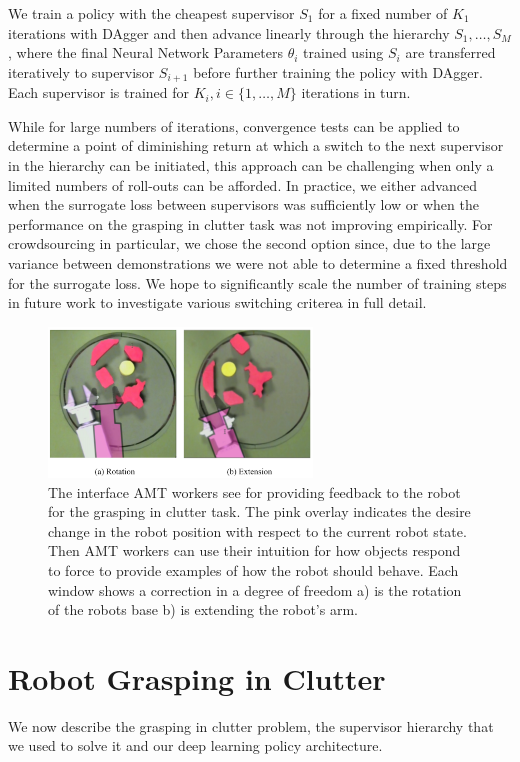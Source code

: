 \documentclass[10pt, conference]{ieeeconf}      %
\begin{document}
We train a policy with the cheapest supervisor $S_1$ for a fixed number of $K_1$ iterations with DAgger and then advance
linearly through the hierarchy $S_1, \ldots, S_M$, where the final Neural Network Parameters $\theta_i$ trained using
$S_i$ are transferred iteratively to supervisor $S_{i+1}$ before further training the policy with DAgger.
Each supervisor is trained for $K_i, i\in \{1, \ldots, M\}$ iterations in turn. 

While for large numbers of iterations, convergence tests can be applied to determine a point of diminishing return at
which a switch to the next supervisor in the hierarchy can be initiated, this approach can be challenging when only a
limited numbers of roll-outs can be afforded. In practice, we either advanced when the surrogate loss between
supervisors was sufficiently low or when the performance on the grasping in clutter task was not improving empirically. 
For crowdsourcing in particular, we chose the second option since, due to the large variance between demonstrations
we were not able to determine a fixed threshold for the surrogate loss. We hope to significantly scale the number of
training steps in future work to investigate various switching criterea in full detail.

\begin{figure}[t]
\centering

\includegraphics[width=\columnwidth, height=4cm]{f_figs/labeling.pdf}

\caption{\footnotesize  The interface AMT workers see for providing feedback to the robot for the grasping in clutter task. The pink overlay indicates the desire change in the robot position with respect to the current robot state. Then AMT workers can use their intuition for how objects respond to force to provide examples of how the robot should behave. Each window shows a correction in a degree of freedom a) is the rotation of the robots base b) is extending the robot's arm.}
\vspace*{-10pt}
\label{fig:overlays}
\end{figure}


\section{Robot Grasping in Clutter}
We now describe the grasping in clutter problem, the supervisor hierarchy that we used to solve it and our deep learning policy architecture. 
\end{document}
